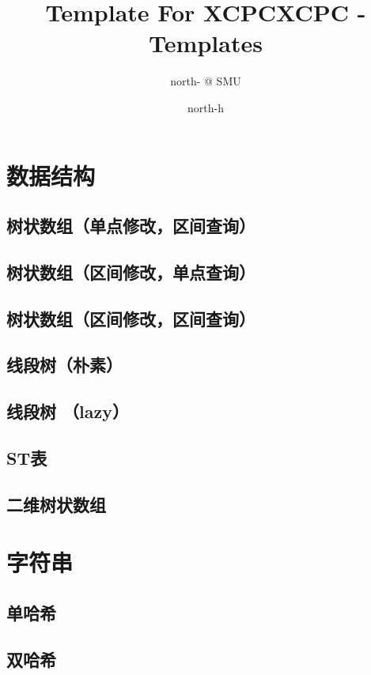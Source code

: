\documentclass[10pt,a4paper]{article}
\title{Template For XCPC}
\author{north- @ SMU}
\begin{document}
\title{XCPC - Templates}
\author {north-h}
\date{}
\maketitle
\tableofcontents
\newpage
\section{数据结构}
\subsection{树状数组（单点修改，区间查询）}

\subsection{树状数组（区间修改，单点查询）}

\subsection{树状数组（区间修改，区间查询）}

\subsection{线段树（朴素）}

\subsection{线段树 （lazy）}

\subsection{ST表}

\subsection{二维树状数组}

\section{字符串}
\subsection{单哈希}

\subsection{双哈希}

\end{document}
